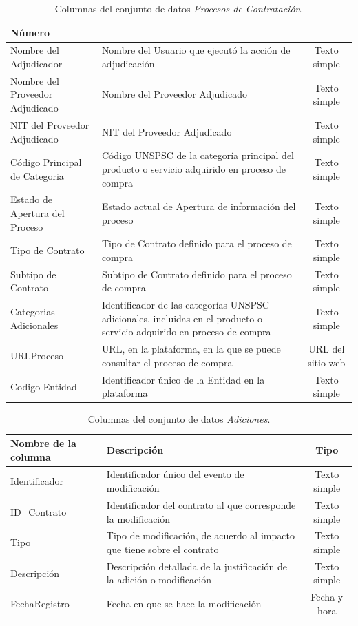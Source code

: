 \documentclass[11pt,letterpaper,oneside]{article}
\begin{document}
\begin{table}[!htp]
\begin{tabular}{|p{3cm}|p{6.5cm}|c|}
		Número \\ \hline
		Nombre del Adjudicador &	
		Nombre del Usuario que ejecutó la acción de adjudicación &
		Texto simple \\ \hline
		Nombre del Proveedor Adjudicado &	
		Nombre del Proveedor Adjudicado &
		Texto simple \\ \hline
		NIT del Proveedor Adjudicado &	
		NIT del Proveedor Adjudicado &
		Texto simple \\ \hline
		Código Principal de Categoria &	
		Código UNSPSC de la categoría principal del producto o servicio adquirido en proceso de compra &
		Texto simple \\ \hline
		Estado de Apertura del Proceso &	
		Estado actual de Apertura de información del proceso &
		Texto simple \\ \hline
		Tipo de Contrato &	
		Tipo de Contrato definido para el proceso de compra &
		Texto simple \\ \hline
		Subtipo de Contrato &	
		Subtipo de Contrato definido para el proceso de compra &
		Texto simple \\ \hline
		Categorias Adicionales &	
		Identificador de las categorías UNSPSC adicionales, incluidas en el producto o servicio adquirido en proceso de compra &
		Texto simple \\ \hline
		URLProceso &	
		URL, en la plataforma, en la que se puede consultar el proceso de compra &
		URL del sitio web \\ \hline
		Codigo Entidad &	
		Identificador único de la Entidad en la plataforma &
		Texto simple \\ \hline
	\end{tabular}
	\caption{Columnas del conjunto de datos \textit{Procesos de Contratación}.}
	\label{tab:t03}
\end{table}

	\begin{table}[!htp]
	\tiny 
	\centering
	\begin{tabular}{|p{3cm}|p{6.5cm}|c|}
		\hline
		\textbf{Nombre de la columna} & \textbf{Descripción} & \textbf{Tipo} \\
		\hline
		Identificador & Identificador único del evento de modificación & Texto simple \\
		\hline
		ID\_Contrato & Identificador del contrato al que corresponde la modificación & Texto simple \\
		\hline
		Tipo & Tipo de modificación, de acuerdo al impacto que tiene sobre el contrato & Texto simple \\
		\hline
		Descripción & Descripción detallada de la justificación de la adición o modificación & Texto simple \\
		\hline
		FechaRegistro & Fecha en que se hace la modificación & Fecha y hora \\
		\hline
	\end{tabular}
	\caption{Columnas del conjunto de datos \textit{Adiciones}.}
	\label{tab:t04}
\end{table}
	
	
	\newpage
	
	
	
\end{document}
